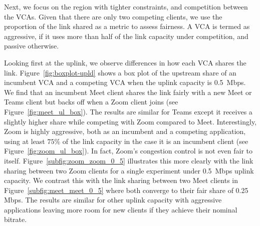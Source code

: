 Next, we focus on the region with tighter constraints, and competition between the VCAs. Given that there are only two competing clients, we use the proportion of the link shared as a metric to assess fairness. A VCA is termed as aggressive, if it uses more than half of the link capacity under competition, and passive otherwise. 

Looking first at the uplink, we observe differences in how each VCA shares the link. Figure~\ref{fig:boxplot-upld} shows a box plot of the upstream share of an incumbent VCA and a competing VCA when the uplink capacity is 0.5~Mbps.  We find that an incumbent Meet client shares the link fairly with a new Meet or Teams client but backs off when a Zoom client joins (see Figure~\ref{fig:meet_ul_box}). The results are similar for Teams except it receives a slightly higher share while competing with Zoom compared to Meet. Interestingly, Zoom is highly aggressive, both as an incumbent and a competing application, using at least $75\%$ of the link capacity in the case it is an incumbent client (see Figure~\ref{fig:zoom_ul_box}). In fact, Zoom's congestion control is not even fair to itself. Figure~\ref{subfig:zoom_zoom_0_5} illustrates this more clearly with the link sharing between two Zoom clients for a single experiment under 0.5~Mbps uplink capacity. We contrast this with the link sharing between two Meet clients in Figure~\ref{subfig:meet_meet_0_5} where both converge to their fair share of 0.25 Mbps. The results are similar for other uplink capacity with aggressive applications leaving more room for new clients if they achieve their nominal bitrate.  %

